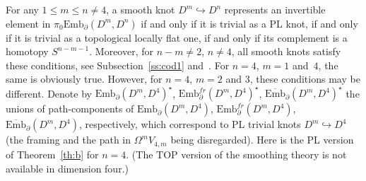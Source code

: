 \documentclass[11pt]{amsart}
\theoremstyle{definition}
\newcommand{\Embmn}{\mathrm{Emb}_\partial(D^m,D^n)}
\newcommand{\Ebar}{\overline{\mathrm{Emb}}}
\newcommand{\Emb}{\mathrm{Emb}}
\newcommand{\TOP}{\mathrm{TOP}}
\numberwithin{equation}{section}
\begin{document}
For any $1\leq m\leq n\neq 4$, a smooth knot $D^m\hookrightarrow D^n$ represents an invertible element in $\pi_0\Embmn$ if and only if it is trivial
as a PL knot, if and only if it is trivial as a topological locally flat one, if and only if its complement is a homotopy $S^{n-m-1}$. Moreover, for $n-m\neq 2$, $n\neq 4$, all smooth knots satisfy these conditions, see Subsection~\ref{ss:cod1} and~\cite{Stallings,Zeeman}. For $n=4$, $m=1$ and~$4$, the same is obviously true. However, for $n=4$, $m=2$ and $3$, these  conditions may be different. Denote by $\Emb_\partial(D^m,D^4)^\star$, 
$\Emb_\partial^{fr}(D^m,D^4)^\star$, $\Ebar_\partial(D^m,D^4)^\star$ the unions of path-components of $\Emb_\partial(D^m,D^4)$, 
$\Emb_\partial^{fr}(D^m,D^4)$, $\Ebar_\partial(D^m,D^4)$, respectively, which correspond to PL trivial knots $D^m\hookrightarrow D^4$ (the framing
and the path in $\Omega^mV_{4,m}$ being disregarded). Here is the PL version of Theorem~\ref{th:b} for $n=4$. (The $\TOP$ version of the smoothing theory is not available in dimension four.)
\end{document}
